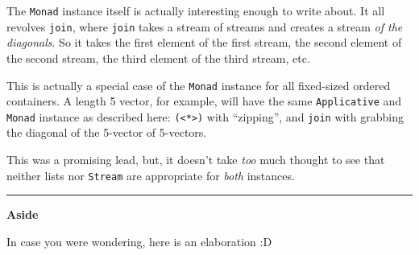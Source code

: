 \documentclass[]{article}
\begin{document}
The \texttt{Monad} instance itself is actually interesting enough to
write about. It all revolves \texttt{join}, where \texttt{join} takes a
stream of streams and creates a stream \emph{of the diagonals}. So it
takes the first element of the first stream, the second element of the
second stream, the third element of the third stream, etc.

This is actually a special case of the \texttt{Monad} instance for all
fixed-sized ordered containers. A length 5 vector, for example, will
have the same \texttt{Applicative} and \texttt{Monad} instance as
described here: \texttt{(\textless{}*\textgreater{})} with ``zipping'',
and \texttt{join} with grabbing the diagonal of the 5-vector of
5-vectors.

This was a promising lead, but, it doesn't take \emph{too} much thought
to see that neither lists nor \texttt{Stream} are appropriate for
\emph{both} instances.

\begin{center}\rule{0.5\linewidth}{\linethickness}\end{center}

\textbf{Aside}

In case you were wondering, here is an elaboration :D
\end{document}
